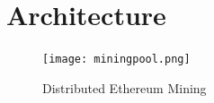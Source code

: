 \documentclass[10pt, conference, compsocconf]{IEEEtran}
\begin{document}

\section{Architecture}
\begin{figure}[H]
\centering
\texttt{[image: miningpool.png]}
\caption{\label{fig:miningpool} Distributed Ethereum Mining}
\end{figure}
\end{document}
